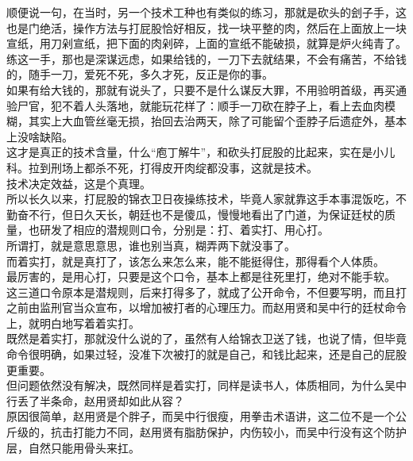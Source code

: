 \begin{multicols}{\theparacolNo}
顺便说一句，在当时，另一个技术工种也有类似的练习，那就是砍头的刽子手，这也是门绝活，操作方法与打屁股恰好相反，找一块平整的肉，然后在上面放上一块宣纸，用刀剁宣纸，把下面的肉剁碎，上面的宣纸不能破损，就算是炉火纯青了。\\

练这一手，那也是深谋远虑，如果给钱的，一刀下去就结果，不会有痛苦，不给钱的，随手一刀，爱死不死，多久才死，反正是你的事。\\

如果有给大钱的，那就有说头了，只要不是什么谋反大罪，不用验明首级，再买通验尸官，犯不着人头落地，就能玩花样了：顺手一刀砍在脖子上，看上去血肉模糊，其实上大血管丝毫无损，抬回去治两天，除了可能留个歪脖子后遗症外，基本上没啥缺陷。\\

这才是真正的技术含量，什么“庖丁解牛”，和砍头打屁股的比起来，实在是小儿科。拉到刑场上都杀不死，打得皮开肉绽都没事，这就是技术。\\

技术决定效益，这是个真理。\\

所以长久以来，打屁股的锦衣卫日夜操练技术，毕竟人家就靠这手本事混饭吃，不勤奋不行，但日久天长，朝廷也不是傻瓜，慢慢地看出了门道，为保证廷杖的质量，也研发了相应的潜规则口令，分别是：打、着实打、用心打。\\

所谓打，就是意思意思，谁也别当真，糊弄两下就没事了。\\

而着实打，就是真打了，该怎么来怎么来，能不能挺得住，那得看个人体质。\\

最厉害的，是用心打，只要是这个口令，基本上都是往死里打，绝对不能手软。\\

这三道口令原本是潜规则，后来打得多了，就成了公开命令，不但要写明，而且打之前由监刑官当众宣布，以增加被打者的心理压力。而赵用贤和吴中行的廷杖命令上，就明白地写着着实打。\\

既然是着实打，那就没什么说的了，虽然有人给锦衣卫送了钱，也说了情，但毕竟命令很明确，如果过轻，没准下次被打的就是自己，和钱比起来，还是自己的屁股更重要。\\

但问题依然没有解决，既然同样是着实打，同样是读书人，体质相同，为什么吴中行丢了半条命，赵用贤却如此从容？\\

原因很简单，赵用贤是个胖子，而吴中行很瘦，用拳击术语讲，这二位不是一个公斤级的，抗击打能力不同，赵用贤有脂肪保护，内伤较小，而吴中行没有这个防护层，自然只能用骨头来扛。\\


\end{multicols}
